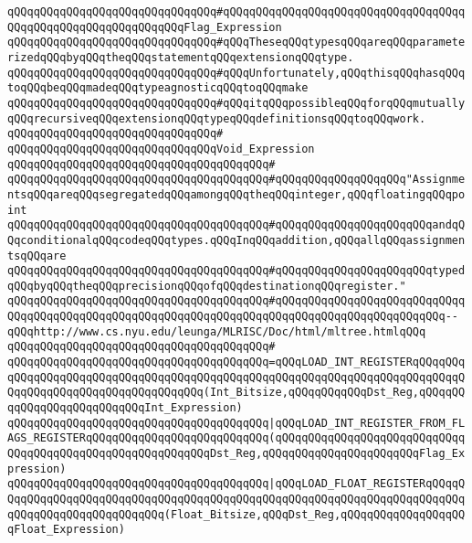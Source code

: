 \verb|qQQqqQQqqQQqqQQqqQQqqQQqqQQqqQQq#qQQqqQQqqQQqqQQqqQQqqQQqqQQqqQQqqQQqqQQqqQQqqQQqqQQqqQQqqQQqqQQqFlag_Expression|\newline
\verb|qQQqqQQqqQQqqQQqqQQqqQQqqQQqqQQq#qQQqTheseqQQqtypesqQQqareqQQqparameterizedqQQqbyqQQqtheqQQqstatementqQQqextensionqQQqtype.|\newline
\verb|qQQqqQQqqQQqqQQqqQQqqQQqqQQqqQQq#qQQqUnfortunately,qQQqthisqQQqhasqQQqtoqQQqbeqQQqmadeqQQqtypeagnosticqQQqtoqQQqmake|\newline
\verb|qQQqqQQqqQQqqQQqqQQqqQQqqQQqqQQq#qQQqitqQQqpossibleqQQqforqQQqmutuallyqQQqrecursiveqQQqextensionqQQqtypeqQQqdefinitionsqQQqtoqQQqwork.|\newline
\verb|qQQqqQQqqQQqqQQqqQQqqQQqqQQqqQQq#|\newline
\verb|qQQqqQQqqQQqqQQqqQQqqQQqqQQqqQQqVoid_Expression|\newline
\verb|qQQqqQQqqQQqqQQqqQQqqQQqqQQqqQQqqQQqqQQq#|\newline
\verb|qQQqqQQqqQQqqQQqqQQqqQQqqQQqqQQqqQQqqQQq#qQQqqQQqqQQqqQQqqQQq"AssignmentsqQQqareqQQqsegregatedqQQqamongqQQqtheqQQqinteger,qQQqfloatingqQQqpoint|\newline
\verb|qQQqqQQqqQQqqQQqqQQqqQQqqQQqqQQqqQQqqQQq#qQQqqQQqqQQqqQQqqQQqqQQqandqQQqconditionalqQQqcodeqQQqtypes.qQQqInqQQqaddition,qQQqallqQQqassignmentsqQQqare|\newline
\verb|qQQqqQQqqQQqqQQqqQQqqQQqqQQqqQQqqQQqqQQq#qQQqqQQqqQQqqQQqqQQqqQQqtypedqQQqbyqQQqtheqQQqprecisionqQQqofqQQqdestinationqQQqregister."|\newline
\verb|qQQqqQQqqQQqqQQqqQQqqQQqqQQqqQQqqQQqqQQq#qQQqqQQqqQQqqQQqqQQqqQQqqQQqqQQqqQQqqQQqqQQqqQQqqQQqqQQqqQQqqQQqqQQqqQQqqQQqqQQqqQQqqQQqqQQqqQQq--qQQqhttp://www.cs.nyu.edu/leunga/MLRISC/Doc/html/mltree.htmlqQQq|\newline
\verb|qQQqqQQqqQQqqQQqqQQqqQQqqQQqqQQqqQQqqQQq#|\newline
\verb|qQQqqQQqqQQqqQQqqQQqqQQqqQQqqQQqqQQqqQQq=qQQqLOAD_INT_REGISTERqQQqqQQqqQQqqQQqqQQqqQQqqQQqqQQqqQQqqQQqqQQqqQQqqQQqqQQqqQQqqQQqqQQqqQQqqQQqqQQqqQQqqQQqqQQqqQQqqQQqqQQqqQQq(Int_Bitsize,qQQqqQQqqQQqDst_Reg,qQQqqQQqqQQqqQQqqQQqqQQqqQQqInt_Expression)|\newline
\verb|qQQqqQQqqQQqqQQqqQQqqQQqqQQqqQQqqQQqqQQq|\verb#|qQQqLOAD_INT_REGISTER_FROM_FLAGS_REGISTERqQQqqQQqqQQqqQQqqQQqqQQqqQQq(qQQqqQQqqQQqqQQqqQQqqQQqqQQqqQQqqQQqqQQqqQQqqQQqqQQqqQQqqQQqDst_Reg,qQQqqQQqqQQqqQQqqQQqqQQqFlag_Expression)#\newline
\verb|qQQqqQQqqQQqqQQqqQQqqQQqqQQqqQQqqQQqqQQq|\verb#|qQQqLOAD_FLOAT_REGISTERqQQqqQQqqQQqqQQqqQQqqQQqqQQqqQQqqQQqqQQqqQQqqQQqqQQqqQQqqQQqqQQqqQQqqQQqqQQqqQQqqQQqqQQqqQQqqQQqqQQq(Float_Bitsize,qQQqDst_Reg,qQQqqQQqqQQqqQQqqQQqFloat_Expression)#\newline
